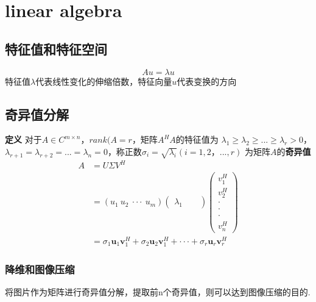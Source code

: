 \chapter{linear algebra}

\section{特征值和特征空间}
\begin{equation}
    Au = \lambda u
\end{equation}
特征值$\lambda$代表线性变化的伸缩倍数，特征向量$u$代表变换的方向

\section{奇异值分解}
\textbf{定义} 对于$A \in C^{m \times n}$，$rank(A = r$，矩阵$A^HA$的特征值为
$\lambda_1 \geqslant \lambda_2 \geqslant ... \geqslant \lambda_r > 0$，
$\lambda_{r+1} = \lambda_{r+2} = ... = \lambda_{n} = 0$，称正数$\sigma_i = \sqrt{\lambda_i}(i = 1,2，...,r) $
为矩阵$A$的\textbf{奇异值}
\\
\begin{equation}
    \begin{split}
        A
        &= U \Sigma V^H \\
        &= (u_1\ u_2\ \cdot \cdot \cdot\ u_m)
        \begin{pmatrix}
            \lambda_1 &  &
        \end{pmatrix}
        \begin{pmatrix}
            v_1^H \\
            v_2^H \\
            \cdot \\
            \cdot \\
            \cdot \\
            v_n^H
        \end{pmatrix}
        \\
        &= \sigma_1 \boldsymbol{u}_1 \boldsymbol{v}_1^H + \sigma_2 \boldsymbol{u}_2 \boldsymbol{v}_1^H + \cdot\cdot\cdot + \sigma_r \boldsymbol{u}_r \boldsymbol{v}_r^H
    \end{split}
\end{equation}

\subsection{降维和图像压缩}
将图片作为矩阵进行奇异值分解，提取前n个奇异值，则可以达到图像压缩的目的.